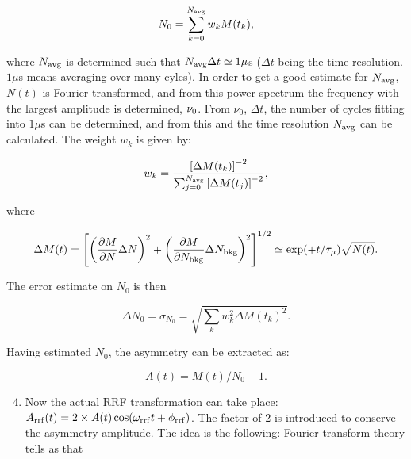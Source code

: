 \documentclass[twoside]{article}
\begin{document}
\begin{equation}\label{eq:N0estimate}
 N_0 = \sum_{k=0}^{N_{\rm avg}} w_k M(t_k),
\end{equation}

\noindent where $N_{\rm avg}$ is determined such that $N_{\rm avg} \Delta t \simeq 1 \mu$s ($\Delta t$ being the 
time resolution. $1 \mu$s means averaging over many cyles). In order to get a good estimate for $N_{\rm avg}$, $N(t)$ is Fourier 
transformed, and from this power spectrum the frequency with the largest amplitude is determined, $\nu_{\rm 0}$. From $\nu_0$, 
$\Delta t$, the number of cycles fitting into $1 \mu$s can be determined, and from this and the time resolution $N_{\rm avg}$
can be calculated. The weight $w_k$ is given by:

\begin{equation}
 w_k = \frac{\left[\Delta M(t_k)\right]^{-2}}{\sum_{j=0}^{N_{\rm avg}} \left[\Delta M(t_j)\right]^{-2}},
\end{equation}

\noindent where 

\begin{equation}
  \Delta M(t) = \left[ \left(\frac{\partial M}{\partial N} \Delta N\right)^2 + 
                       \left(\frac{\partial M}{\partial N_{\rm bkg}} \Delta N_{\rm bkg}\right)^2 \right]^{1/2} 
              \simeq \exp(+t/\tau_\mu) \sqrt{N(t)}.
\end{equation} 

\noindent The error estimate on $N_0$ is then

\begin{equation}\label{eq:N0-rrf}
 \Delta N_0 = \sigma_{N_0} = \sqrt{\sum_k w_k^2 \Delta M(t_k)^2}.
\end{equation}

\noindent Having estimated $N_0$, the asymmetry can be extracted as:

\begin{equation}
 A(t) = M(t) / N_0 - 1.
\end{equation}

\begin{enumerate}
 \setcounter{enumi}{3}
 \item Now the actual RRF transformation can take place: $A_{\rm rrf}(t) = 2 \times A(t) \cos(\omega_{\rm rrf} t + \phi_{\rm rrf})$. 
       The factor of 2 is introduced to conserve the asymmetry amplitude. The idea is the following: Fourier transform theory tells as that
\end{enumerate}
\end{document}
